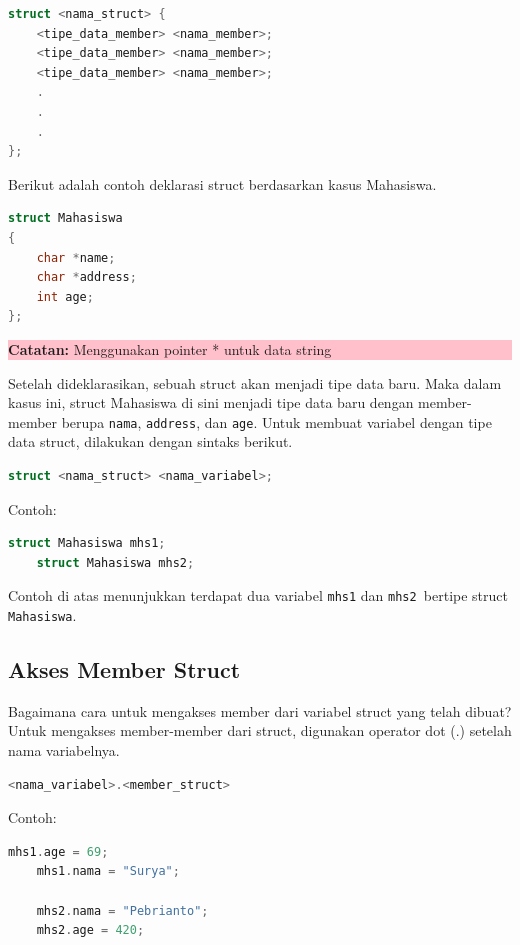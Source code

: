 \begin{lstlisting}[language=c]
struct <nama_struct> {
    <tipe_data_member> <nama_member>;
    <tipe_data_member> <nama_member>;
    <tipe_data_member> <nama_member>;
    .
    .
    .
};
\end{lstlisting}

Berikut adalah contoh deklarasi struct berdasarkan kasus Mahasiswa.
\begin{lstlisting}[language=c]
struct Mahasiswa
{
    char *name;
    char *address;
    int age;
};
\end{lstlisting}
\begin{center}
    \colorbox{pink}{\parbox{0.8\linewidth}{\textbf{Catatan:}  Menggunakan pointer * untuk data string}}
\end{center}

Setelah dideklarasikan, sebuah struct akan menjadi tipe data baru.
Maka dalam kasus ini, struct Mahasiswa di sini menjadi tipe data baru dengan member-member berupa \verb|nama|, \verb|address|, dan \verb|age|.
Untuk membuat variabel dengan tipe data struct, dilakukan dengan sintaks berikut.

\begin{lstlisting}[language=c]
    struct <nama_struct> <nama_variabel>;
\end{lstlisting}

Contoh:
\begin{lstlisting}[language=c]
    struct Mahasiswa mhs1;
    struct Mahasiswa mhs2;
\end{lstlisting}
Contoh di atas menunjukkan terdapat dua variabel \verb|mhs1| dan \verb|mhs2 |bertipe struct \verb|Mahasiswa|.

\subsection{Akses Member Struct}
Bagaimana cara untuk mengakses member dari variabel struct yang telah dibuat? \\
Untuk mengakses member-member dari struct, digunakan operator dot (.) setelah nama variabelnya.
\begin{lstlisting}[language=c]
    <nama_variabel>.<member_struct>
\end{lstlisting}

Contoh:
\begin{lstlisting}[language=c]
    mhs1.age = 69;
    mhs1.nama = "Surya";
    
    mhs2.nama = "Pebrianto";
    mhs2.age = 420;
\end{lstlisting}

